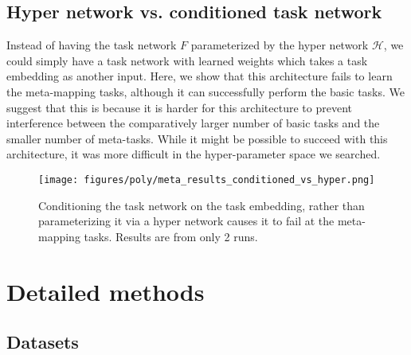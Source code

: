 \subsection{Hyper network vs. conditioned task network} \label{app_lesion_results_hyper}
Instead of having the task network $F$ parameterized by the hyper network $\mathcal{H}$, we could simply have a task network with learned weights which takes a task embedding as another input. Here, we show that this architecture fails to learn the meta-mapping tasks, although it can successfully perform the basic tasks. We suggest that this is because it is harder for this architecture to prevent interference between the comparatively larger number of basic tasks and the smaller number of meta-tasks. While it might be possible to succeed with this architecture, it was more difficult in the hyper-parameter space we searched.\par 
\begin{figure}[H]
\centering
\texttt{[image: figures/poly/meta\_results\_conditioned\_vs\_hyper.png]}
\caption{Conditioning the task network on the task embedding, rather than parameterizing it via a hyper network causes it to fail at the meta-mapping tasks. Results are from only 2 runs.}
\label{supp_lesion_hyper}
\end{figure}

\section{Detailed methods} \label{app_detailed_methods}
\subsection{Datasets}
